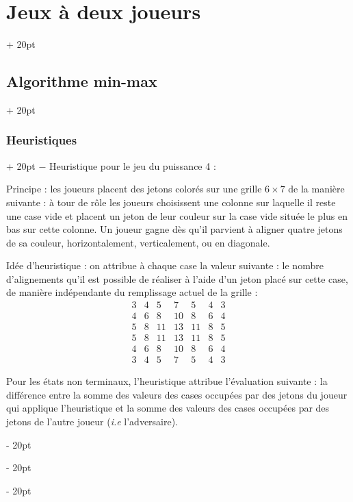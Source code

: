 \documentclass[a4paper, 12pt, twoside]{article}
\newcommand{\ind}[1][20pt]{\advance\leftskip + #1}
\newcommand{\deind}[1][20pt]{\advance\leftskip - #1}
\newenvironment{indt}[2][20pt]{#2 \par \ind[#1]}{\par \deind} %
\begin{document}
\begin{indt}{\section{Jeux à deux joueurs}}
\begin{indt}{\subsection{Algorithme min-max}}
\begin{indt}{\subsubsection{Heuristiques}}
                $-$ Heuristique pour le jeu du puissance 4 :

                Principe : les joueurs placent des jetons colorés sur une grille $6 \times 7$ de la manière suivante : à tour de rôle les joueurs choisissent une colonne sur laquelle il reste une case vide et placent un jeton de leur couleur sur la case vide située le plus en bas sur cette colonne.
                Un joueur gagne dès qu'il parvient à aligner quatre jetons de sa couleur, horizontalement, verticalement, ou en diagonale.

                Idée d'heuristique : on attribue à chaque case la valeur suivante : le nombre d'alignements qu'il est possible de réaliser à l'aide d'un jeton placé sur cette case, de manière indépendante du remplissage actuel de la grille :
                \[
                    \begin{matrix}
                        3 & 4 & 5 & 7 & 5 & 4 & 3
                        \\
                        4 & 6 & 8 & 10 & 8 & 6 & 4
                        \\
                        5 & 8 & 11 & 13 & 11 & 8 & 5
                        \\
                        5 & 8 & 11 & 13 & 11 & 8 & 5
                        \\
                        4 & 6 & 8 & 10 & 8 & 6 & 4
                        \\
                        3 & 4 & 5 & 7 & 5 & 4 & 3
                    \end{matrix}
                \]

                Pour les états non terminaux, l'heuristique attribue l'évaluation suivante : la différence entre la somme des valeurs des cases occupées par des jetons du joueur qui applique l'heuristique et la somme des valeurs des cases occupées par des jetons de l'autre joueur (\textit{i.e} l'adversaire).


\end{indt}
\end{indt}
\end{indt}
\end{document}
